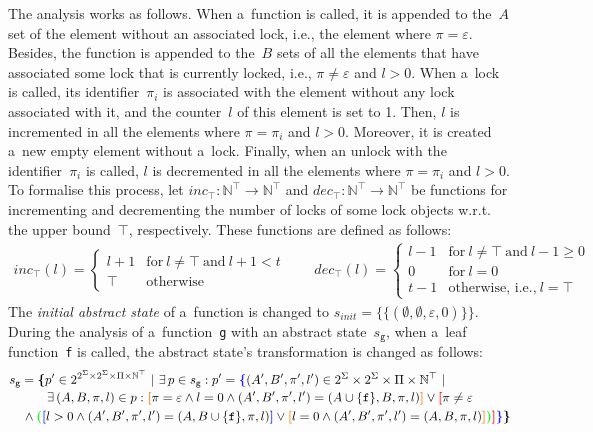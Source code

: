 The analysis works as follows. When a~function is called, it is appended to the~$ A $ set of the element without an associated lock, i.e., the element where $ \pi = \varepsilon $. Besides, the function is appended to the~$ B $ sets of all the elements that have associated some lock that is currently locked, i.e., $ \pi \neq \varepsilon $ and $ l > 0 $. When a~lock is called, its identifier~$ \pi_i $ is associated with the element without any lock associated with it, and the counter~$ l $ of this element is set to 1. Then, $ l $ is incremented in all the elements where $ \pi = \pi_i $ and $ l > 0 $. Moreover, it is created a~new empty element without a~lock. Finally, when an unlock with the identifier~$ \pi_i $ is called, $ l $ is decremented in all the elements where $ \pi = \pi_i $ and $ l > 0 $. To formalise this process, let $ inc_\top : \mathbb{N}^\top\!\rightarrow \mathbb{N}^\top $ and $ dec_\top : \mathbb{N}^\top\!\rightarrow \mathbb{N}^\top $ be functions for incrementing and decrementing the number of locks of some lock objects w.r.t. the upper bound~$ \top $, respectively. These functions are defined as follows:
\begin{gather*}
    inc_\top(l) =
    \begin{cases}
        l + 1 & \text{for}\ l \neq \top\ \text{and}\ l + 1 < t \\
        \top & \text{otherwise}
    \end{cases}
%
    \qquad
%
    dec_\top(l) =
    \begin{cases}
        l - 1 & \text{for}\ l \neq \top\ \text{and}\ l - 1 \geq 0 \\
        0 & \text{for}\ l = 0 \\
        t - 1 & \text{otherwise, i.e.,}\ l = \top
    \end{cases}
\end{gather*}
The \emph{initial abstract state} of a~function is changed to $ s_{init} = \{\{(\emptyset, \emptyset, \varepsilon, 0)\}\} $. During the analysis of a~function~\texttt{g} with an abstract state~$ s_\mathtt{g} $, when a~leaf function~\texttt{f} is called, the abstract state's transformation is changed as follows:
$$
\begin{multlined}
    s_\mathtt{g} = \bb{\{}p^\prime \in 2^{2^\Sigma \times 2^\Sigma \times \Pi \times \mathbb{N}^\top}\ |\ \exists\,p \in s_\mathtt{g} : p^\prime = \bA{\{} (A^\prime, B^\prime, \pi^\prime, l^\prime) \in 2^\Sigma \times 2^\Sigma \times \Pi \times \mathbb{N}^\top\ |\ \\
%
    \exists\,(A, B, \pi, l) \in p : \bB{[}\pi = \varepsilon \wedge l = 0 \wedge (A^\prime, B^\prime, \pi^\prime, l^\prime) = (A \cup \{\mathtt{f}\}, B, \pi, l)\bB{]} \vee \bC{[}\pi \neq \varepsilon \\
%
    \wedge \bD{(}\bA{[}l > 0 \wedge (A^\prime, B^\prime, \pi^\prime, l^\prime) = (A, B \cup \{\mathtt{f}\}, \pi, l)\bA{]} \vee \bB{[}l = 0 \wedge (A^\prime, B^\prime, \pi^\prime, l^\prime) = (A, B, \pi, l)%
%
    \bB{]}\bD{)}\bC{]}\bA{\}}\bb{\}}
\end{multlined}
$$
